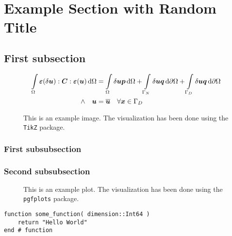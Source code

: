 \section{Example Section with Random Title}
\blindtext[3]

\subsection{First subsection}
\blindtext[4]
\begin{equation}
	\begin{aligned}
		\int \limits_\Omega \boldsymbol{\varepsilon}(\delta\boldsymbol{u}) : \boldsymbol{C} : \boldsymbol{\varepsilon}(\boldsymbol{u})\,\mathrm{d}\Omega
		&= \int \limits_\Omega \delta\boldsymbol{u} \boldsymbol{p}\,\mathrm{d}\Omega
		 + \int \limits_{\Gamma_N} \delta\boldsymbol{u} \boldsymbol{q}\,\mathrm{d}\partial\Omega
		 + \int \limits_{\Gamma_D} \delta\boldsymbol{u} \boldsymbol{q}\,\mathrm{d}\partial\Omega \\
		\land \quad \boldsymbol{u} &= \overline{\boldsymbol{u}} \quad \forall \boldsymbol{x} \in \Gamma_D \\
	\end{aligned}
\end{equation}
\blindtext[2]
\begin{figure}
	\begin{center}
		
	\end{center}
	\caption{This is an example image. The visualization has been done using the \texttt{TikZ} package.}
	\label{fig:example_tikz_image}
\end{figure}
\subsubsection{First subsubsection}
 \blindtext[3]
\blindtext[3]
\subsubsection{Second subsubsection}
\blindtext[4]
\begin{figure}
	\begin{center}
		
	\end{center}
	\caption{This is an example plot. The visualization has been done using the \texttt{pgfplots} package.}
	\label{fig:example_tikz_image}
\end{figure}
\cite{bathe2007finite} \blindtext[5]

\begin{lstlisting}[caption = {Example of 'lstlisting' with Julia code}, label = {code:example}, float]
function some_function( dimension::Int64 )
	return "Hello World"
end # function
\end{lstlisting}

